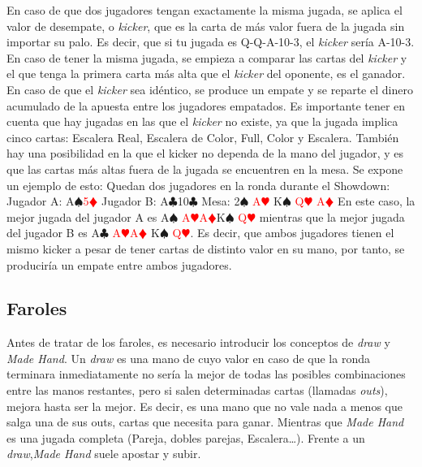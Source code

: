 En caso de que dos jugadores tengan exactamente la misma jugada, se aplica el valor de desempate, o \textit{kicker}, que es la carta de más valor fuera de la jugada sin importar su palo. Es decir, que si tu jugada es Q-Q-A-10-3, el \textit{kicker} sería A-10-3. En caso de tener la misma jugada, se empieza a comparar las cartas del \textit{kicker} y el que tenga la primera carta más alta que el \textit{kicker} del oponente, es el ganador.  En caso de que el \textit{kicker} sea idéntico, se produce un empate y se reparte el dinero acumulado de la apuesta entre los jugadores empatados.
Es importante tener en cuenta que hay jugadas en las que el \textit{kicker} no existe, ya que la jugada implica cinco cartas: Escalera Real, Escalera de Color, Full, Color y Escalera. 
También hay una posibilidad en la que el kicker no dependa de la mano del jugador, y es que las cartas más altas fuera de la jugada se encuentren en la mesa. Se expone un ejemplo de esto:
Quedan dos jugadores en la ronda durante el Showdown:
Jugador A: A$\spadesuit$\textcolor{red}{5$\vardiamondsuit$}
Jugador B: A$\clubsuit$10$\clubsuit$
Mesa: 2$\spadesuit$ \textcolor{red}{A$\varheartsuit$} K$\spadesuit$ \textcolor{red}{Q$\varheartsuit$ A$\vardiamondsuit$}
En este caso, la mejor jugada del jugador A es A$\spadesuit$ \textcolor{red}{A$\varheartsuit$A$\vardiamondsuit$}K$\spadesuit$ \textcolor{red}{Q$\varheartsuit$} mientras que la mejor jugada del jugador B es A$\clubsuit$ \textcolor{red}{A$\varheartsuit$A$\vardiamondsuit$} K$\spadesuit$ \textcolor{red}{Q$\varheartsuit$}. Es decir, que ambos jugadores tienen el mismo kicker a pesar de tener cartas de distinto valor en su mano, por tanto, se produciría un empate entre ambos jugadores.

\subsection{Faroles}
\label{sec:bluff}

Antes de tratar de los faroles, es necesario introducir los conceptos de \textit{draw} y \textit{Made Hand}. Un \textit{draw} es una mano de cuyo valor en caso de que la ronda terminara inmediatamente no sería la mejor de todas las posibles combinaciones entre las manos restantes, pero si salen determinadas cartas (llamadas \textit{outs}), mejora hasta ser la mejor. Es decir, es una mano que no vale nada a menos que salga una de sus outs, cartas que necesita para ganar. Mientras que \textit{Made Hand} es una jugada completa (Pareja, dobles parejas, Escalera…). Frente a un \textit{draw},\textit{Made Hand} suele apostar y subir. \cite{chen}

